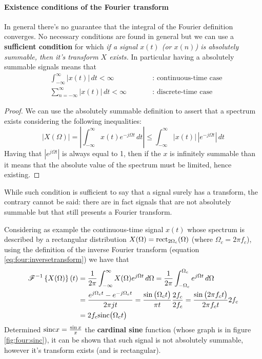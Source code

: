 	\paragraph{Existence conditions of the Fourier transform} \label{sec:four:sufficient} In general there's no guarantee that the integral of the Fourier definition converges. No necessary conditions are found in general but we can use a \textbf{sufficient condition} for which {\itshape if a signal $x(t)$ (or $x(n)$) is absolutely summable, then it's transform $X$ exists.} In particular having a absolutely summable signals means that
	\begin{align*}
		& \int_{-\infty}^\infty |x(t)|\, dt < \infty  && \textrm{: continuous-time case} \\
		& \sum_{n=-\infty}^\infty |x(t)|\, dt < \infty \qquad && \textrm{: discrete-time case}
	\end{align*}

	\begin{proof}
		We can use the absolutely summable definition to assert that a spectrum exists considering the following inequalities:
		\[|X(\Omega)| = \left| \int_{-\infty}^\infty x(t) e^{-j\Omega t}\, dt \right| \leq \int_{-\infty}^\infty |x(t)|\, \left|e^{-j\Omega t}\right| \, dt\]
		Having that $|e^{j\Omega t}|$ is always equal to 1, then if the $x$ is infinitely summable than it means that the absolute value of the spectrum must be limited, hence existing.
	\end{proof} \noindent

	While such condition is sufficient to say that a signal surely has a transform, the contrary cannot be said: there are in fact signals that are not absolutely summable but that still presents a Fourier transform.
	
	Considering as example the continuous-time signal $x(t)$ whose spectrum is described by a rectangular distribution $X(\Omega) = \textrm{rect}_{2\Omega_c} (\Omega)$ (where $\Omega_c = 2\pi f_c$), using the definition of the inverse Fourier transform (equation \ref{eq:four:inversetransform}) we have that
	\begin{align*}
		\mathscr{F}^{-1}\left\{ X(\Omega) \right\}(t) & = \frac 1 {2\pi} \int_{-\infty}^\infty X(\Omega) e^{j\Omega t}\, d\Omega = \frac 1 {2\pi} \int_{-\Omega_c}^{\Omega_c} e^{j\Omega t}\, d\Omega \\
		& = \frac{e^{j\Omega_c t} - e^{-j\Omega_c t}}{2\pi j t} = \frac{\sin\big(\Omega_c t\big)}{\pi t} \frac{2f_c}{2f_c} = \frac{\sin\big(2\pi f_c t\big)}{2\pi f_c t} 2f_c  \\ 
		& = 2 f_c \textrm{sinc}\big(\Omega_c t\big)
	\end{align*}
	Determined $\textrm{sinc} x = \frac{\sin x}{x}$ the \textbf{cardinal sine} function (whose graph is in figure \ref{fig:four:sinc}), it can be shown that such signal is not absolutely summable, however it's transform exists (and is rectangular).
	
